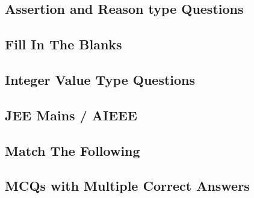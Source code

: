 \subsection*{Assertion and Reason type Questions}
\begin{enumerate}[label=\thesubsection.\arabic*,ref=\thesubsection.\theenumi]




\end{enumerate}
\subsection*{Fill In The Blanks}
\begin{enumerate}[label=\thesubsection.\arabic*,ref=\thesubsection.\theenumi]




\end{enumerate}
\subsection*{Integer Value Type Questions}
\begin{enumerate}[label=\thesubsection.\arabic*,ref=\thesubsection.\theenumi]




\end{enumerate}
\subsection*{JEE Mains / AIEEE}
\begin{enumerate}[label=\thesubsection.\arabic*,ref=\thesubsection.\theenumi]




\end{enumerate}
\subsection*{Match The Following}
\begin{enumerate}[label=\thesubsection.\arabic*,ref=\thesubsection.\theenumi]




\end{enumerate}
\subsection*{MCQs with Multiple Correct Answers}
\begin{enumerate}[label=\thesubsection.\arabic*,ref=\thesubsection.\theenumi]





\end{enumerate}
